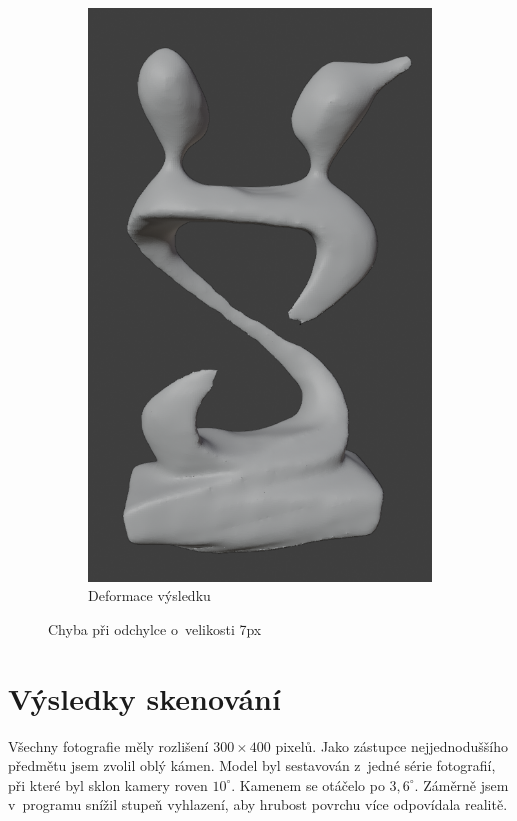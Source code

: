 \documentclass[12pt]{report}			%
\begin{document}
\begin{figure}[h]
\begin{subfigure}[b]{0.3\textwidth}
                     \includegraphics[width=\textwidth]{images/zkreslenyVysledek.png}
                     \caption{Deformace výsledku}
                    \end{subfigure}
                    \caption{Chyba při odchylce o~velikosti 7px}
                \end{figure}

    	   \section{Výsledky skenování}

                Všechny fotografie měly rozlišení $300\times400$ pixelů. Jako zástupce nejjednoduššího předmětu jsem zvolil oblý kámen. Model byl sestavován z~jedné série fotografií, při které byl sklon kamery roven $10^\circ$. Kamenem se otáčelo po $3,6^\circ$. Záměrně jsem v~programu snížil stupeň vyhlazení, aby hrubost povrchu více odpovídala realitě.
\end{document}
